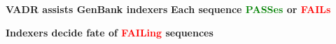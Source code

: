 \documentclass[landscape]{slides}
\begin{document}
\begin{slide}
\begin{center}
\large{\textbf{VADR assists GenBank indexers}}
\large{\textbf{Each sequence \textcolor{green}{PASSes} or \textcolor{red}{FAILs}}}
\end{center}


\vfill
\end{slide}
\begin{slide}
\begin{center}
\large{\textbf{Indexers decide fate of \textcolor{red}{FAILing} sequences}}
\end{center}


\vfill
\end{slide}
\end{document}
